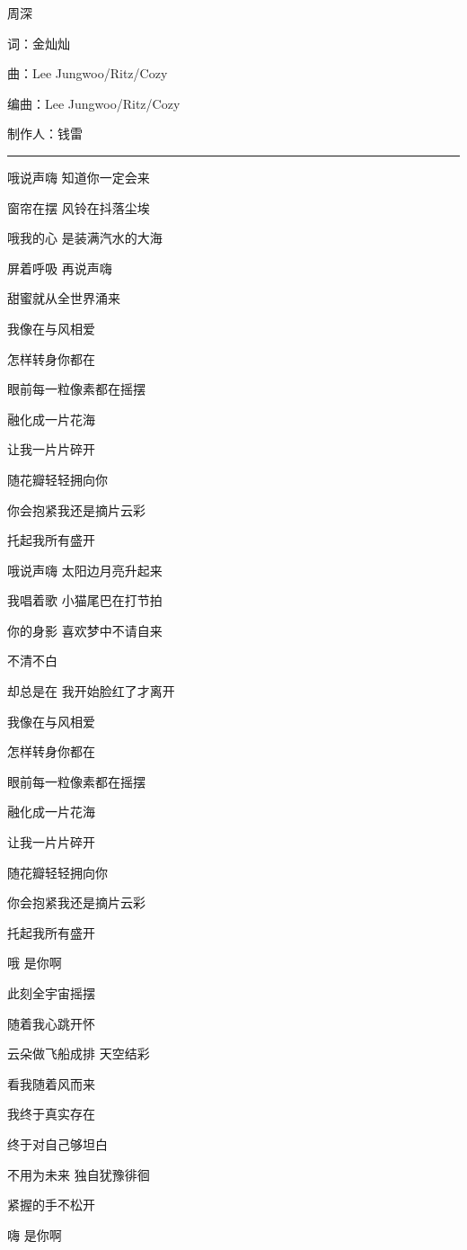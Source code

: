 \documentclass[]{ctexbook}
\begin{document}
周深

词：金灿灿

曲：Lee Jungwoo/Ritz/Cozy

编曲：Lee Jungwoo/Ritz/Cozy

制作人：钱雷

\begin{center}\rule{0.5\linewidth}{0.5pt}\end{center}

哦说声嗨 知道你一定会来

窗帘在摆 风铃在抖落尘埃

哦我的心 是装满汽水的大海

屏着呼吸 再说声嗨

甜蜜就从全世界涌来

我像在与风相爱

怎样转身你都在

眼前每一粒像素都在摇摆

融化成一片花海

让我一片片碎开

随花瓣轻轻拥向你

你会抱紧我还是摘片云彩

托起我所有盛开

哦说声嗨 太阳边月亮升起来

我唱着歌 小猫尾巴在打节拍

你的身影 喜欢梦中不请自来

不清不白

却总是在 我开始脸红了才离开

我像在与风相爱

怎样转身你都在

眼前每一粒像素都在摇摆

融化成一片花海

让我一片片碎开

随花瓣轻轻拥向你

你会抱紧我还是摘片云彩

托起我所有盛开

哦 是你啊

此刻全宇宙摇摆

随着我心跳开怀

云朵做飞船成排 天空结彩

看我随着风而来

我终于真实存在

终于对自己够坦白

不用为未来 独自犹豫徘徊

紧握的手不松开

嗨 是你啊
\end{document}
